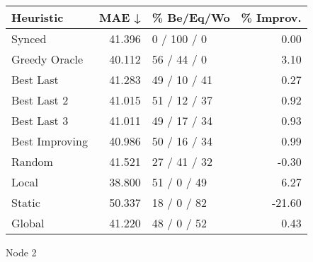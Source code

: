 \begin{tabular}{lrlr}
\toprule
\textbf{Heuristic} & \textbf{MAE ↓} & \textbf{\% Be/Eq/Wo} & \textbf{\% Improv.} \\
\midrule
            Synced &         41.396 &          0 / 100 / 0 &                0.00 \\
     Greedy Oracle &         40.112 &          56 / 44 / 0 &                3.10 \\
         Best Last &         41.283 &         49 / 10 / 41 &                0.27 \\
       Best Last 2 &         41.015 &         51 / 12 / 37 &                0.92 \\
       Best Last 3 &         41.011 &         49 / 17 / 34 &                0.93 \\
    Best Improving &         40.986 &         50 / 16 / 34 &                0.99 \\
            Random &         41.521 &         27 / 41 / 32 &               -0.30 \\
             Local &         38.800 &          51 / 0 / 49 &                6.27 \\
            Static &         50.337 &          18 / 0 / 82 &              -21.60 \\
            Global &         41.220 &          48 / 0 / 52 &                0.43 \\
\bottomrule
\end{tabular}
\caption{Node 2}
\label{tab:iid_lr05_le2_bs2_2}
